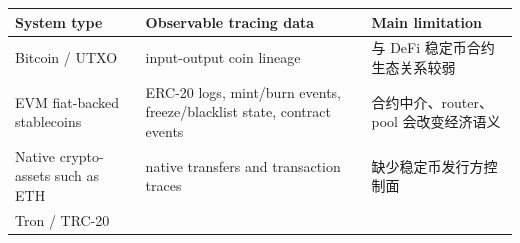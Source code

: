 \documentclass[12pt,a4paper]{ctexart}
\begin{document}
\begin{longtable}[]{@{}lll@{}}
\toprule
\begin{minipage}[b]{0.30\columnwidth}\raggedright
System type\strut
\end{minipage} & \begin{minipage}[b]{0.30\columnwidth}\raggedright
Observable tracing data\strut
\end{minipage} & \begin{minipage}[b]{0.30\columnwidth}\raggedright
Main limitation\strut
\end{minipage}\tabularnewline
\midrule
\endhead
\begin{minipage}[t]{0.30\columnwidth}\raggedright
Bitcoin / UTXO\strut
\end{minipage} & \begin{minipage}[t]{0.30\columnwidth}\raggedright
input-output coin lineage\strut
\end{minipage} & \begin{minipage}[t]{0.30\columnwidth}\raggedright
与 DeFi 稳定币合约生态关系较弱\strut
\end{minipage}\tabularnewline
\begin{minipage}[t]{0.30\columnwidth}\raggedright
EVM fiat-backed stablecoins\strut
\end{minipage} & \begin{minipage}[t]{0.30\columnwidth}\raggedright
ERC-20 logs, mint/burn events, freeze/blacklist state, contract
events\strut
\end{minipage} & \begin{minipage}[t]{0.30\columnwidth}\raggedright
合约中介、router、pool 会改变经济语义\strut
\end{minipage}\tabularnewline
\begin{minipage}[t]{0.30\columnwidth}\raggedright
Native crypto-assets such as ETH\strut
\end{minipage} & \begin{minipage}[t]{0.30\columnwidth}\raggedright
native transfers and transaction traces\strut
\end{minipage} & \begin{minipage}[t]{0.30\columnwidth}\raggedright
缺少稳定币发行方控制面\strut
\end{minipage}\tabularnewline
\begin{minipage}[t]{0.30\columnwidth}\raggedright
Tron / TRC-20\strut
\end{minipage} & \begin{minipage}[t]{0.30\columnwidth}\raggedright

\end{minipage}
\end{longtable}
\end{document}
